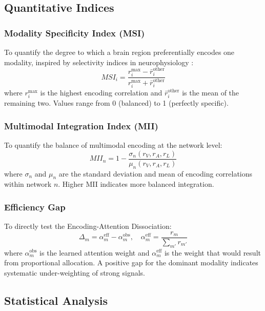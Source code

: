 \documentclass[conference]{IEEEtran}
\begin{document}
\subsection{Quantitative Indices}

\subsubsection{Modality Specificity Index (MSI)}
To quantify the degree to which a brain region preferentially encodes one modality, inspired by selectivity indices in neurophysiology \cite{desimone1984stimulus}:
\begin{equation}\label{eq:msi}
MSI_i = \frac{r_i^{\max} - \bar{r}_i^{\text{other}}}{r_i^{\max} + \bar{r}_i^{\text{other}}}
\end{equation}
where $r_i^{\max}$ is the highest encoding correlation and $\bar{r}_i^{\text{other}}$ is the mean of the remaining two. Values range from 0 (balanced) to 1 (perfectly specific).

\subsubsection{Multimodal Integration Index (MII)}
To quantify the balance of multimodal encoding at the network level:
\begin{equation}\label{eq:mii}
MII_n = 1 - \frac{\sigma_n(r_V, r_A, r_L)}{\mu_n(r_V, r_A, r_L)}
\end{equation}
where $\sigma_n$ and $\mu_n$ are the standard deviation and mean of encoding correlations within network $n$. Higher MII indicates more balanced integration.

\subsubsection{Efficiency Gap}
To directly test the Encoding-Attention Dissociation:
\begin{equation}\label{eq:delta}
\Delta_m = \alpha_m^{\text{eff}} - \alpha_m^{\text{obs}}, \quad \alpha_m^{\text{eff}} = \frac{r_m}{\sum_{m'} r_{m'}}
\end{equation}
where $\alpha_m^{\text{obs}}$ is the learned attention weight and $\alpha_m^{\text{eff}}$ is the weight that would result from proportional allocation. A positive gap for the dominant modality indicates systematic under-weighting of strong signals.

\subsection{Statistical Analysis}
\end{document}
